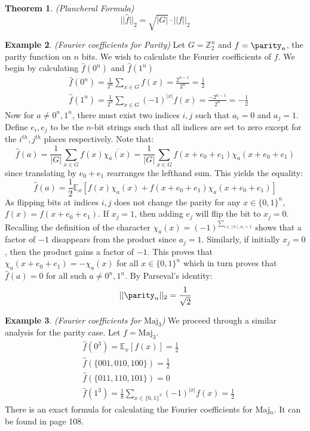 \documentclass{amsart}
\newtheorem{theorem}{Theorem}[section]
\theoremstyle{definition}
\newtheorem{example}[theorem]{Example}
\theoremstyle{remark}
\numberwithin{equation}{section}
\theoremstyle{remark}
\begin{document}
\begin{theorem}{(Plancheral Formula)}
  $$||\hat{f}||_2 = \sqrt{|G|}\cdot||f||_2$$
\end{theorem}
%
\begin{example}{\emph{(Fourier coefficients for Parity)}}
  Let $G = \mathbb{Z}_2^n$ and $f = \parity_n$, the parity function on $n$ bits.
  We wish to calculate the Fourier coefficients of $f$. We begin by calculating $\hat{f}(0^n)$ and $\hat{f}(1^n)$
  \begin{align}
    & \hat{f}(0^n) = \frac{1}{2^n}\sum_{x \in G} f(x) = \frac{2^{n-1}}{2^n} = \frac{1}{2} \\
    & \hat{f}(1^n) = \frac{1}{2^n}\sum_{x \in G} (-1)^{|x|}f(x) = \frac{-2^{n-1}}{2^n} = -\frac{1}{2}
  \end{align}
  Now for $a \neq 0^n,1^n$, there must exist two indices $i,j$ such that $a_i = 0$ and $a_j = 1$. Define $e_i, e_j$ to be the $n$-bit strings such that all indices are set to zero except for the $i^{th},j^{th}$ places respectively. Note that:
  $$ \hat{f}(a) = \frac{1}{|G|} \sum_{x \in G} f(x)\overline{\chi_a(x)} = \frac{1}{|G|}\sum_{x \in G} f(x + e_0 + e_1) \chi_a(x + e_0 + e_1)$$
  since translating by $e_0 + e_1$ rearranges the lefthand sum. This yields the equality:
  $$ \hat{f}(a) = \frac{1}{2}\mathbb{E}_x[f(x)\chi_a(x) + f(x + e_0 + e_1) \chi_a(x + e_0 + e_1)] $$
  As flipping bits at indices $i,j$ does not change the parity for any $x \in \{0,1\}^n$, $f(x) = f(x + e_0 + e_1)$. If $x_j = 1$, then adding $e_j$ will flip the bit to $x_j = 0$. Recalling the definition of the character $\chi_a(x) = (-1)^{\sum_{i \in [n], a_i = 1}}$ shows that a factor of $-1$ disappears from the product since $a_j = 1$. Similarly, if initially $x_j = 0$, then the product gains a factor of $-1$. This proves that $\chi_a(x + e_0 + e_1) = - \chi_a(x)$ for all $x \in \{0,1\}^n$ which in turn proves that $\hat{f}(a) = 0$ for all such $a \neq 0^n,1^n$. By Parseval's identity:
  $$||\parity_n||_2 = \frac{1}{\sqrt{2}} $$
\end{example}
%
\begin{example}{\emph{(Fourier coefficients for $\text{Maj}_3$)}}
 We proceed through a similar analysis for the parity case. Let $f = \text{Maj}_3$.
 \begin{align}
   & \hat{f}(0^3) = \mathbb{E}_x[f(x)] = \frac{1}{2} \\
   & \hat{f}(\{001,010,100\}) = \frac{1}{2} \\
   & \hat{f}(\{011,110,101\}) = 0 \\
   & \hat{f}(1^3) = \frac{1}{8}\sum_{x \in \{0,1\}^3} (-1)^{|x|}f(x) = \frac{1}{2}
 \end{align}
 There is an exact formula for calculating the Fourier coefficients for Maj$_{n}$. It can be found in \cite{odonnell} page 108.
\end{example}
\end{document}
